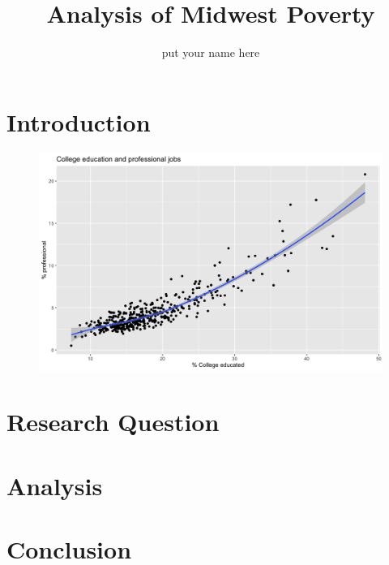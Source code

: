 \documentclass[12pt,a4paper]{article}
\author{put your name here}
\title{Analysis of Midwest Poverty}
\begin{document}
	\maketitle
\section*{Introduction}
\begin{figure}
	\centering
	\includegraphics[width=0.7\linewidth]{corr_plot.png}
	\caption{}
	\label{fig:corrplot}
\end{figure}


\section*{Research Question}

\section*{Analysis}

\section*{Conclusion}
\end{document}
